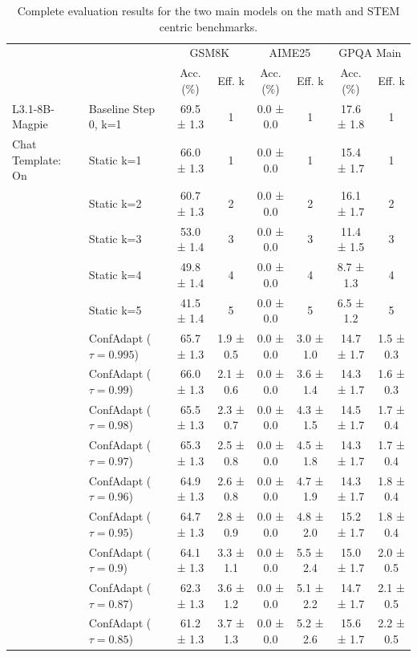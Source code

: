 \documentclass{article}
\theoremstyle{plain}
\theoremstyle{definition}
\theoremstyle{remark}
\begin{document}
\begin{table}[h!]
\small
\caption{Complete evaluation results for the two main models on the math and STEM centric benchmarks.}
\label{tab:math-evals}
\centering
\begin{tabular}{llcccccc}
\toprule
 &  & \multicolumn{2}{c}{GSM8K} & \multicolumn{2}{c}{AIME25} & \multicolumn{2}{c}{GPQA Main} \\
 &  & Acc. (\%) & Eff. k & Acc. (\%) & Eff. k & Acc. (\%) & Eff. k \\
\midrule
L3.1-8B-Magpie & Baseline Step 0, k=1 & 69.5 ± 1.3 & 1 & 0.0 ± 0.0 & 1 & 17.6 ± 1.8 & 1 \\
 Chat Template: On & Static k=1 & 66.0 ± 1.3 & 1 & 0.0 ± 0.0 & 1 & 15.4 ± 1.7 & 1 \\
 & Static k=2 & 60.7 ± 1.3 & 2 & 0.0 ± 0.0 & 2 & 16.1 ± 1.7 & 2 \\
 & Static k=3 & 53.0 ± 1.4 & 3 & 0.0 ± 0.0 & 3 & 11.4 ± 1.5 & 3 \\
 & Static k=4 & 49.8 ± 1.4 & 4 & 0.0 ± 0.0 & 4 & 8.7 ± 1.3 & 4 \\
 & Static k=5 & 41.5 ± 1.4 & 5 & 0.0 ± 0.0 & 5 & 6.5 ± 1.2 & 5 \\
 & ConfAdapt ($\tau=0.995$) & 65.7 ± 1.3 & 1.9 ± 0.5 & 0.0 ± 0.0 & 3.0 ± 1.0 & 14.7 ± 1.7 & 1.5 ± 0.3 \\
 & ConfAdapt ($\tau=0.99$) & 66.0 ± 1.3 & 2.1 ± 0.6 & 0.0 ± 0.0 & 3.6 ± 1.4 & 14.3 ± 1.7 & 1.6 ± 0.3 \\
 & ConfAdapt ($\tau=0.98$) & 65.5 ± 1.3 & 2.3 ± 0.7 & 0.0 ± 0.0 & 4.3 ± 1.5 & 14.5 ± 1.7 & 1.7 ± 0.4 \\
 & ConfAdapt ($\tau=0.97$) & 65.3 ± 1.3 & 2.5 ± 0.8 & 0.0 ± 0.0 & 4.5 ± 1.8 & 14.3 ± 1.7 & 1.7 ± 0.4 \\
 & ConfAdapt ($\tau=0.96$) & 64.9 ± 1.3 & 2.6 ± 0.8 & 0.0 ± 0.0 & 4.7 ± 1.9 & 14.3 ± 1.7 & 1.8 ± 0.4 \\
 & ConfAdapt ($\tau=0.95$) & 64.7 ± 1.3 & 2.8 ± 0.9 & 0.0 ± 0.0 & 4.8 ± 2.0 & 15.2 ± 1.7 & 1.8 ± 0.4 \\
 & ConfAdapt ($\tau=0.9$) & 64.1 ± 1.3 & 3.3 ± 1.1 & 0.0 ± 0.0 & 5.5 ± 2.4 & 15.0 ± 1.7 & 2.0 ± 0.5 \\
 & ConfAdapt ($\tau=0.87$) & 62.3 ± 1.3 & 3.6 ± 1.2 & 0.0 ± 0.0 & 5.1 ± 2.2 & 14.7 ± 1.7 & 2.1 ± 0.5 \\
 & ConfAdapt ($\tau=0.85$) & 61.2 ± 1.3 & 3.7 ± 1.3 & 0.0 ± 0.0 & 5.2 ± 2.6 & 15.6 ± 1.7 & 2.2 ± 0.5 \\

\end{tabular}
\end{table}
\end{document}
